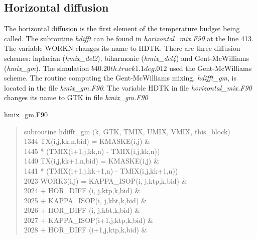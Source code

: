 \begin{appendices}
\subsection{Horizontal diffusion}\label{aTE}

The horizontal diffusion is the first element of the temperature budget being called. The subroutine \textit{hdifft} can be found in \textit{horizontal\_mix.F90} at the line 413. The variable WORKN changes its name to HDTK. There are three diffusion schemes: laplacian (\textit{hmix\_del2}), biharmonic (\textit{hmix\_del4}) and Gent-McWilliams (\textit{hmix\_gm}). The simulation $b40.20th.track1.1deg.012$ used the Gent-McWilliams scheme. The routine computing the Gent-McWilliams mixing, \textit{hdifft\_gm}, is located in the file \textit{hmix\_gm.F90}. The variable HDTK in file \textit{horizontal\_mix.F90} changes its name to GTK in file \textit{hmix\_gm.F90}
\begin{center} hmix\_gm.F90 \end{center}
\begin{quotation}
\small
\linespread{0.5}\selectfont{} \hspace{1em} subroutine hdifft\_gm (k, GTK, TMIX, UMIX, VMIX, this\_block)\\
1344 \hspace{1em} TX(i,j,kk,n,bid) = KMASKE(i,j)  \&\\
1445 \hspace{1em} * (TMIX(i+1,j,kk,n) - TMIX(i,j,kk,n))\\
1440 \hspace{1em} TX(i,j,kk+1,n,bid) = KMASKE(i,j)  \&\\
1441 \hspace{1em} * (TMIX(i+1,j,kk+1,n) - TMIX(i,j,kk+1,n))\\
2023 \hspace{1em} WORK3(i,j) = KAPPA\_ISOP(i,  j,ktp,k,bid)  \&\\
2024 \hspace{1em} + HOR\_DIFF  (i,  j,ktp,k,bid)  \&\\
2025 \hspace{1em} + KAPPA\_ISOP(i,  j,kbt,k,bid)  \&\\
2026 \hspace{1em} + HOR\_DIFF  (i,  j,kbt,k,bid)  \&\\
2027 \hspace{1em} + KAPPA\_ISOP(i+1,j,ktp,k,bid)  \&\\
2028 \hspace{1em} + HOR\_DIFF  (i+1,j,ktp,k,bid)  \&\\

\end{quotation}
\end{appendices}
